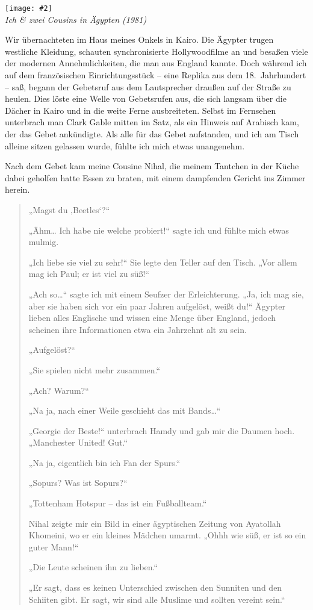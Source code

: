 \documentclass[12pt]{memoir}
\newcommand{\img}[3]{\begin{center}%
\texttt{[image: \#2]}\\{\small\em#3}%
\end{center}}
\begin{document}
\img{scale=0.3}{Hassan_Cousins.jpg}
{Ich \& zwei Cousins in Ägypten (1981)}

Wir übernachteten im Haus meines Onkels in Kairo.
Die Ägypter trugen westliche Kleidung,
schauten synchronisierte Hollywoodfilme an
und besaßen viele der modernen Annehmlichkeiten, die man aus England kannte.
Doch während ich auf dem französischen Einrichtungsstück –
eine Replika aus dem 18.\ Jahrhundert – saß,
begann der Gebetsruf aus dem Lautsprecher draußen auf der Straße zu heulen.
Dies löste eine Welle von Gebetsrufen aus,
die sich langsam über die Dächer in Kairo und in die weite Ferne ausbreiteten.
Selbst im Fernsehen unterbrach man Clark Gable mitten im Satz,
als ein Hinweis auf Arabisch kam, der das Gebet ankündigte.
Als alle für das Gebet aufstanden,
und ich am Tisch alleine sitzen gelassen wurde,
fühlte ich mich etwas unangenehm.

Nach dem Gebet kam meine Cousine Nihal,
die meinem Tantchen in der Küche dabei geholfen hatte Essen zu braten,
mit einem dampfenden Gericht ins Zimmer herein.

\begin{quote}
„Magst du ‚Beetles‘?“

„Ähm… Ich habe nie welche probiert!“ sagte ich und fühlte mich etwas mulmig.

„Ich liebe sie viel zu sehr!“
Sie legte den Teller auf den Tisch.
„Vor allem mag ich Paul; er ist viel zu süß!“

„Ach so…“ sagte ich mit einem Seufzer der Erleichterung.
„Ja, ich mag sie, aber sie haben sich vor ein paar Jahren aufgelöst, weißt du!“
Ägypter lieben alles Englische und wissen eine Menge über England,
jedoch scheinen ihre Informationen etwa ein Jahrzehnt alt zu sein.

„Aufgelöst?“

„Sie spielen nicht mehr zusammen.“

„Ach? Warum?“

„Na ja, nach einer Weile geschieht das mit Bands…“

„Georgie der Beste!“ unterbrach Hamdy und gab mir die Daumen hoch.
„Manchester United! Gut.“

„Na ja, eigentlich bin ich Fan der Spurs.“

„Sopurs? Was ist Sopurs?“

„Tottenham Hotspur – das ist ein Fußballteam.“

Nihal zeigte mir ein Bild in einer ägyptischen Zeitung von Ayatollah Khomeini,
wo er ein kleines Mädchen umarmt. „Ohhh wie süß, er ist so ein guter Mann!“

„Die Leute scheinen ihn zu lieben.“

„Er sagt, dass es keinen Unterschied zwischen den Sunniten
und den Schiiten gibt.
Er sagt, wir sind alle Muslime und sollten vereint sein.“
\end{quote}
\end{document}
